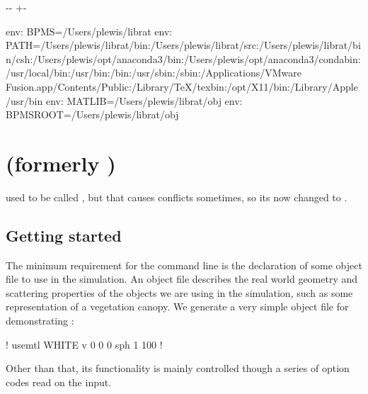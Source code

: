 \documentclass[letterpaper,10pt,english]{sphinxmanual}
\newlength\nbsphinxcodecellspacing
\begin{document}
{

\kern-\sphinxverbatimsmallskipamount\kern-\baselineskip
\kern+\FrameHeightAdjust\kern-\fboxrule
\vspace{\nbsphinxcodecellspacing}

\begin{sphinxVerbatim}[commandchars=\\\{\}]
env: BPMS=/Users/plewis/librat
env: PATH=/Users/plewis/librat/bin:/Users/plewis/librat/src:/Users/plewis/librat/bin/csh:/Users/plewis/opt/anaconda3/bin:/Users/plewis/opt/anaconda3/condabin:/usr/local/bin:/usr/bin:/bin:/usr/sbin:/sbin:/Applications/VMware Fusion.app/Contents/Public:/Library/TeX/texbin:/opt/X11/bin:/Library/Apple/usr/bin
env: MATLIB=/Users/plewis/librat/obj
env: BPMSROOT=/Users/plewis/librat/obj
\end{sphinxVerbatim}
}


\section{ (formerly )}
\label{\detokenize{RATstart:RATstart-(formerly-start)}}
 used to be called , but that causes conflicts sometimes, so its now changed to .


\subsection{Getting started}
\label{\detokenize{RATstart:Getting-started}}
The minimum requirement for the  command line is the declaration of some object file to use in the simulation. An object file describes the real world geometry and scattering properties of the objects we are using in the simulation, such as some representation of a vegetation canopy. We generate a very simple object file for demonstrating :

\begin{sphinxVerbatim}[commandchars=\\\{\}]
!\PYGZob{}
usemtl WHITE
v 0 0 0
sph \PYGZhy{}1 100
!\PYGZcb{}
\end{sphinxVerbatim}

Other than that, its functionality is mainly controlled though a series of option codes read on the input.
\end{document}
